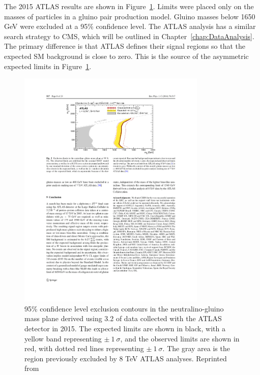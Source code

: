 The 2015 ATLAS results are shown in Figure~\ref{fig:Limits2015ATLAS}. 
Limits were placed only on the masses of particles in a gluino pair production model. 
Gluino masses below 1650 GeV were excluded at a 95\% confidence level.
The ATLAS analysis has a similar search strategy to CMS, which will be outlined in Chapter~\ref{chap:DataAnalysis}. 
The primary difference is that ATLAS defines their signal regions so that the expected SM background is close to zero. 
This is the source of the asymmetric expected limits in Figure~\ref{fig:Limits2015ATLAS}.

\begin{figure}[h]
\begin{center}
\includegraphics[width=0.8\textwidth]{Figures/Theory/2015ATLAS.pdf}
\end{center}
    \caption{95\% confidence level exclusion contours in the neutralino-gluino mass plane derived using 3.2 \fbinv of data collected with the ATLAS detector in 2015. The expected limits are shown in black, with a yellow band representing $\pm~1~\sigma$, and the observed limits are shown in red, with dotted red lines representing $\pm~1~\sigma$. The gray area is the region previously excluded by 8 TeV ATLAS analyses. Reprinted from \cite{ATLAS:2016aa}}
    \label{fig:Limits2015ATLAS}
\end{figure}


